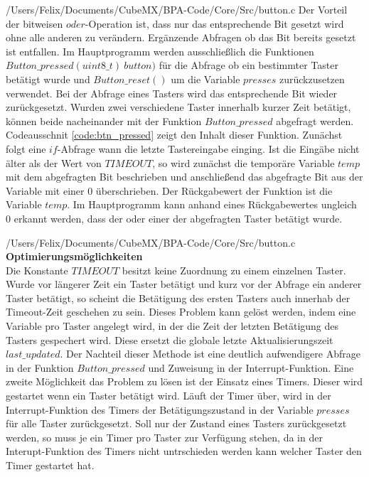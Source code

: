 
{/Users/Felix/Documents/CubeMX/BPA-Code/Core/Src/button.c}
Der Vorteil der bitweisen $oder$-Operation ist, dass nur das entsprechende Bit gesetzt wird ohne alle anderen zu verändern. Ergänzende Abfragen ob das Bit bereits gesetzt ist entfallen.
Im Hauptprogramm werden ausschließlich die Funktionen $Button\_pressed(uint8\_t)\ button)$ für die Abfrage ob ein bestimmter Taster betätigt wurde und $Button\_reset()$ um die Variable $presses$ zurückzusetzen verwendet. Bei der Abfrage eines Tasters wird das entsprechende Bit wieder zurückgesetzt. Wurden zwei verschiedene Taster innerhalb kurzer Zeit betätigt, können beide nacheinander mit der Funktion $Button\_pressed$ abgefragt werden. Codeausschnit \ref{code:btn_pressed} zeigt den Inhalt dieser Funktion. Zunächst folgt eine $if$-Abfrage wann die letzte Tastereingabe einging. Ist die Eingäbe nicht älter als der Wert von $TIMEOUT$, so wird zunächst die temporäre Variable $temp$ mit dem abgefragten Bit beschrieben und anschließend das abgefragte Bit aus der Variable mit einer $0$ überschrieben. Der Rückgabewert der Funktion ist die Variable $temp$. Im Hauptprogramm kann anhand eines Rückgabewertes ungleich $0$ erkannt werden, dass der oder einer der abgefragten Taster betätigt wurde.

{/Users/Felix/Documents/CubeMX/BPA-Code/Core/Src/button.c}
\textbf{Optimierungsmöglichkeiten}\\
Die Konstante $TIMEOUT$ besitzt keine Zuordnung zu einem einzelnen Taster. Wurde vor längerer Zeit ein Taster betätigt und kurz vor der Abfrage ein anderer Taster betätigt, so scheint die Betätigung des ersten Tasters auch innerhab der Timeout-Zeit geschehen zu sein. Dieses Problem kann gelöst werden, indem eine Variable pro Taster angelegt wird, in der die Zeit der letzten Betätigung des Tasters gespechert wird. Diese ersetzt die globale letzte Aktualisierungszeit $last\_updated$. Der Nachteil dieser Methode ist eine deutlich aufwendigere Abfrage in der Funktion $Button\_pressed$ und Zuweisung in der Interrupt-Funktion. Eine zweite Möglichkeit das Problem zu lösen ist der Einsatz eines Timers. Dieser wird gestartet wenn ein Taster betätigt wird. Läuft der Timer über, wird in der Interrupt-Funktion des Timers der Betätigungszustand in der Variable $presses$ für alle Taster zurückgesetzt. Soll nur der Zustand eines Tasters zurückgesetzt werden, so muss je ein Timer pro Taster zur Verfügung stehen, da in der Interupt-Funktion des Timers nicht untrschieden werden kann welcher Taster den Timer gestartet hat.